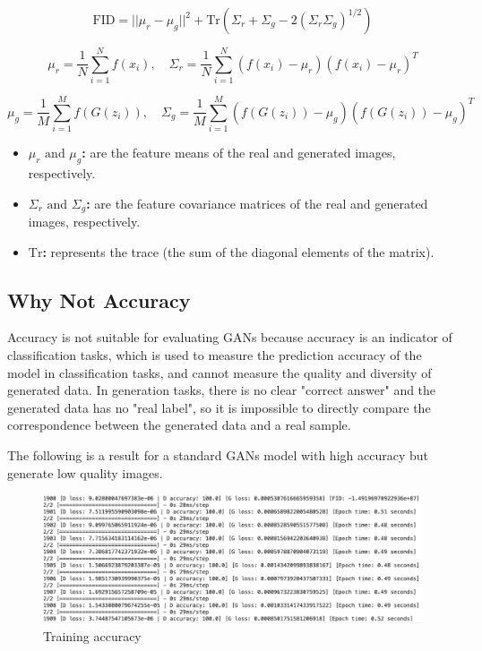 \begin{equation}
    \text{FID} = || \mu_r - \mu_g ||^2 + \text{Tr}(\Sigma_r + \Sigma_g - 2(\Sigma_r \Sigma_g)^{1/2})
\end{equation}


\begin{equation}
    \mu_r = \frac{1}{N} \sum_{i=1}^{N} f(x_i), \quad \Sigma_r = \frac{1}{N} \sum_{i=1}^{N} (f(x_i) - \mu_r)(f(x_i) - \mu_r)^T
\end{equation}

\begin{equation}
    \mu_g = \frac{1}{M} \sum_{i=1}^{M} f(G(z_i)), \quad \Sigma_g = \frac{1}{M} \sum_{i=1}^{M} (f(G(z_i)) - \mu_g)(f(G(z_i)) - \mu_g)^T
\end{equation}


\begin{itemize}
    \item \textbf{ $\mu_r \text{ and } \mu_g$:}  are the feature means of the real and generated images, respectively.
    \item \textbf{$\Sigma_r \text{ and } \Sigma_g$:}  are the feature covariance matrices of the real and generated images, respectively.
    \item \textbf{ $\text{Tr}$:}  represents the trace (the sum of the diagonal elements of the matrix).
\end{itemize}


\subsection{Why Not Accuracy}

Accuracy is not suitable for evaluating GANs because accuracy is an indicator of classification tasks, 
which is used to measure the prediction accuracy of the model in classification tasks, and cannot 
measure the quality and diversity of generated data. In generation tasks, there is no clear 
"correct answer" and the generated data has no "real label", so it is impossible to directly 
compare the correspondence between the generated data and a real sample. 

The following is a result for a standard GANs model with high accuracy but generate low quality images.


\begin{figure}[H]
    \centering
    \includegraphics[width=1.2\linewidth]{./Images/model_accuracy.jpg}
    \caption{Training accuracy}
    \label{fig:my_picture}
\end{figure}

